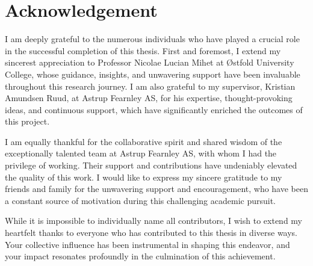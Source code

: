 \chapter*{Acknowledgement}

I am deeply grateful to the numerous individuals who have played a crucial role in the successful completion of this thesis. 
First and foremost, I extend my sincerest appreciation to Professor Nicolae Lucian Mihet at Østfold University College, 
whose guidance, insights, and unwavering support have been invaluable throughout this research journey. 
I am also grateful to my supervisor, Kristian Amundsen Ruud, at Astrup Fearnley AS, for his expertise, thought-provoking ideas, and continuous support, which have significantly enriched the outcomes of this project.

I am equally thankful for the collaborative spirit and shared wisdom of the exceptionally talented team at Astrup Fearnley AS, with whom I had the privilege of working. 
Their support and contributions have undeniably elevated the quality of this work. 
I would like to express my sincere gratitude to my friends and family for the unwavering support and encouragement, who have been a constant source of motivation during this challenging academic pursuit.

While it is impossible to individually name all contributors, I wish to extend my heartfelt thanks to everyone who has contributed to this thesis in diverse ways. 
Your collective influence has been instrumental in shaping this endeavor, and your impact resonates profoundly in the culmination of this achievement.
